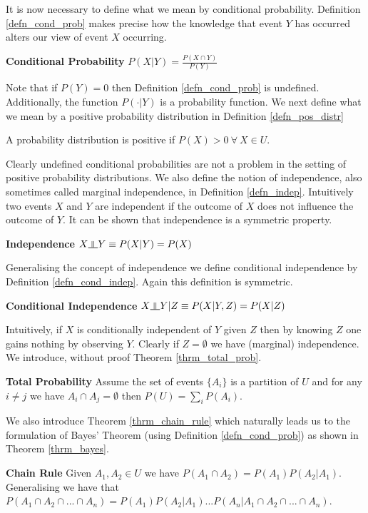 \documentclass[../masters.tex]{subfiles}
\begin{document}
It is now necessary to define what we mean by conditional probability. Definition \ref{defn_cond_prob} makes precise how the knowledge that event $Y$ has occurred alters our view of event $X$ occurring.  
\begin{defn}
\textbf{Conditional Probability} $P(X|Y) = \frac{P(X\cap Y)}{P(Y)}$ 
\label{defn_cond_prob}
\end{defn}
Note that if $P(Y) = 0$ then Definition \ref{defn_cond_prob} is undefined. Additionally, the function $P(\cdot|Y)$ is a probability function. We next define what we mean by a positive probability distribution in Definition \ref{defn_pos_distr} 
\begin{defn}
A probability distribution is positive if $P(X) > 0~\forall~X \in U$.
\label{defn_pos_distr}
\end{defn}
Clearly undefined conditional probabilities are not a problem in the setting of positive probability distributions. We also define the notion of independence, also sometimes called marginal independence, in Definition \ref{defn_indep}. Intuitively two events $X$ and $Y$ are independent if the outcome of $X$ does not influence the outcome of $Y$. It can be shown that independence is a symmetric property.
\begin{defn}
\textbf{Independence} $X \indep Y \equiv P(X|Y) = P(X)$ 
\label{defn_indep}
\end{defn}
Generalising the concept of independence we define conditional independence by Definition \ref{defn_cond_indep}. Again this definition is symmetric.
\begin{defn}
\textbf{Conditional Independence} $X \indep Y | Z \equiv P(X|Y,Z) = P(X|Z)$
\label{defn_cond_indep}
\end{defn}
Intuitively, if $X$ is conditionally independent of $Y$ given $Z$ then by knowing $Z$ one gains nothing by observing $Y$. Clearly if $Z=\emptyset$ we have (marginal) independence.
We introduce, without proof Theorem \ref{thrm_total_prob}.
\begin{thrm}
\textbf{Total Probability} Assume the set of events $\{A_i\}$ is a partition of $U$ and for any $i \neq j$ we have $A_i \cap A_j = \emptyset$ then $P(U) = \sum_iP(A_i)$.
\label{thrm_total_prob}
\end{thrm}
We also introduce Theorem \ref{thrm_chain_rule} which naturally leads us to the formulation of Bayes' Theorem (using Definition \ref{defn_cond_prob}) as shown in Theorem \ref{thrm_bayes}. 
\begin{thrm}
\label{thrm_chain_rule}  
\textbf{Chain Rule} Given $A_1, A_2 \in U$ we have $P(A_1\cap A_2) = P(A_1)P(A_2|A_1)$. Generalising we have that $P(A_1\cap A_2\cap ... \cap A_n) = P(A_1)P(A_2|A_1)...P(A_n|A_1\cap A_2 \cap ... \cap A_n)$.
\end{thrm}
\end{document}
